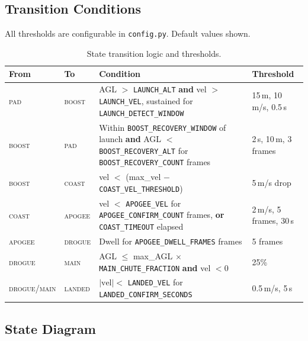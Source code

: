 \documentclass[11pt, a4paper, twoside]{article}
\newcommand{\config}[1]{\texttt{#1}}
\newcommand{\state}[1]{\textsc{#1}}
\newcommand{\file}[1]{\texttt{#1}}
\begin{document}
\subsection{Transition Conditions}
\label{sec:fsm-transitions}

All thresholds are configurable in \file{config.py}. Default values shown.

\begin{table}[ht]
\centering
\small
\caption{State transition logic and thresholds.}
\label{tab:transitions}
\begin{tabularx}{\textwidth}{l l X l}
\toprule
\textbf{From} & \textbf{To} & \textbf{Condition} & \textbf{Threshold} \\
\midrule
\state{pad} & \state{boost} & AGL $>$ \config{LAUNCH\_ALT} \textbf{and} vel $>$ \config{LAUNCH\_VEL}, sustained for \config{LAUNCH\_DETECT\_WINDOW} & 15\,m, 10\,m/s, 0.5\,s \\
\state{boost} & \state{pad} & Within \config{BOOST\_RECOVERY\_WINDOW} of launch \textbf{and} AGL $<$ \config{BOOST\_RECOVERY\_ALT} for \config{BOOST\_RECOVERY\_COUNT} frames & 2\,s, 10\,m, 3 frames \\
\state{boost} & \state{coast} & vel $<$ (max\_vel $-$ \config{COAST\_VEL\_THRESHOLD}) & 5\,m/s drop \\
\state{coast} & \state{apogee} & vel $<$ \config{APOGEE\_VEL} for \config{APOGEE\_CONFIRM\_COUNT} frames, \textbf{or} \config{COAST\_TIMEOUT} elapsed & 2\,m/s, 5 frames, 30\,s \\
\state{apogee} & \state{drogue} & Dwell for \config{APOGEE\_DWELL\_FRAMES} frames & 5 frames \\
\state{drogue} & \state{main} & AGL $\leq$ max\_AGL $\times$ \config{MAIN\_CHUTE\_FRACTION} \textbf{and} vel $< 0$ & 25\% \\
\state{drogue}/\state{main} & \state{landed} & $|\text{vel}| <$ \config{LANDED\_VEL} for \config{LANDED\_CONFIRM\_SECONDS} & 0.5\,m/s, 5\,s \\
\bottomrule
\end{tabularx}
\end{table}

\subsection{State Diagram}
\end{document}

